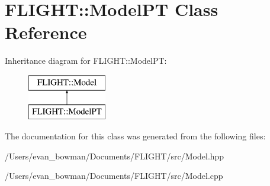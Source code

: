 \hypertarget{class_f_l_i_g_h_t_1_1_model_p_t}{}\section{F\+L\+I\+G\+HT\+:\+:Model\+PT Class Reference}
\label{class_f_l_i_g_h_t_1_1_model_p_t}
Inheritance diagram for F\+L\+I\+G\+HT\+:\+:Model\+PT\+:\begin{figure}[H]
\begin{center}
\leavevmode
\includegraphics[height=2.000000cm]{class_f_l_i_g_h_t_1_1_model_p_t}
\end{center}
\end{figure}


The documentation for this class was generated from the following files\+:\begin{DoxyCompactItemize}
\item 
/\+Users/evan\+\_\+bowman/\+Documents/\+F\+L\+I\+G\+H\+T/src/Model.\+hpp\item 
/\+Users/evan\+\_\+bowman/\+Documents/\+F\+L\+I\+G\+H\+T/src/Model.\+cpp\end{DoxyCompactItemize}
